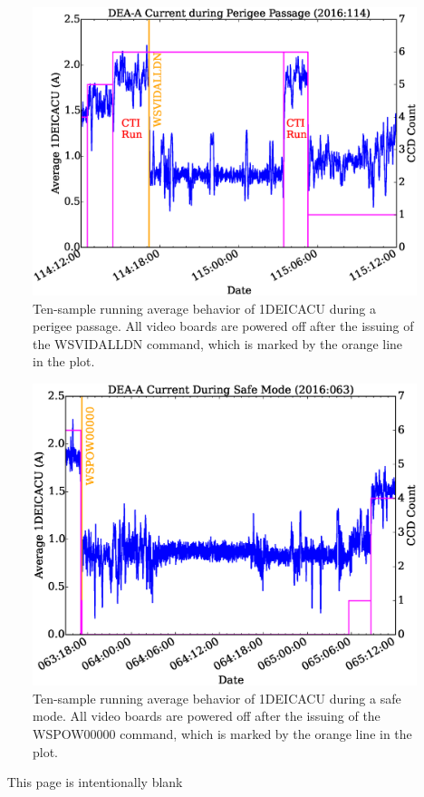 \documentclass[11pt]{article}
\begin{document}
\begin{landscape}
\begin{figure}
\begin{center}
\includegraphics[width=1.2\textwidth]{deaa_on_fig1.eps}
\caption{Ten-sample running average behavior of 1DEICACU during a perigee passage. All video boards
are powered off after the issuing of the WSVIDALLDN command, which is marked by
the orange line in the plot.}
\end{center}
\end{figure}
\end{landscape}

\begin{landscape}
\begin{figure}
\begin{center}
\includegraphics[width=1.2\textwidth]{deaa_on_fig2.eps}
\caption{Ten-sample running average behavior of 1DEICACU during a safe mode. All video boards
are powered off after the issuing of the WSPOW00000 command, which is marked by
the orange line in the plot.}
\end{center}
\end{figure}
\end{landscape}

\newpage\
\vspace{0.4\textheight}
\bc This page is intentionally blank \ec

\newcommand{\tablecaptiontext}{TURN ON DEA A (realtime version)}

\end{document}
